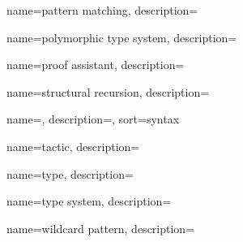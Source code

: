 {
  name={pattern matching},
  description={}
}

{
  name={polymorphic type system},
  description={}
}

{
  name={proof assistant},
  description={}
}

{
  name={structural recursion},
  description={}
}

{
  name=,
  description={},
  sort={syntax}
}

{
  name={tactic},
  description={}
}

{
  name={type},
  description={}
}

{
  name={type system},
  description={}
}

{
  name={wildcard pattern},
  description={}
}
